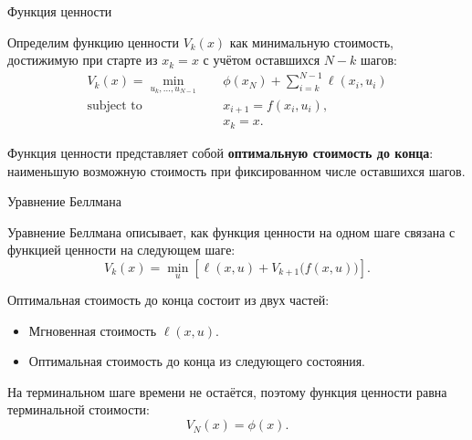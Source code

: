 \documentclass{beamer}
\begin{document}
	\begin{frame}{Функция ценности}
		\begin{flushleft}
			
			Определим функцию ценности $V_k(x)$ как минимальную
			стоимость, достижимую при старте из $x_k=x$ с
			учётом оставшихся $N-k$ шагов:
			\[
			\begin{aligned}
				V_k(x)=\min_{u_k,\ldots,u_{N-1}}\quad
				&\phi(x_N)+\sum_{i=k}^{N-1}\ell(x_i,u_i)\\
				\text{subject to}\quad
				&x_{i+1}=f(x_i,u_i),\\
				&x_k=x.
			\end{aligned}
			\]
			
			\medskip
			
			Функция ценности представляет собой \textbf{оптимальную
				стоимость до конца}: наименьшую возможную стоимость при
			фиксированном числе оставшихся шагов.
			
		\end{flushleft}
	\end{frame}
	
	\begin{frame}{Уравнение Беллмана}
		\begin{flushleft}
			
			Уравнение Беллмана описывает, как функция ценности
			на одном шаге связана с функцией ценности на
			следующем шаге:
			\[
			\boxed{
				V_k(x)=\min_u
				\left[
				\ell(x,u)+V_{k+1}\bigl(f(x,u)\bigr)
				\right].
			}
			\]
			
			\medskip
			
			Оптимальная стоимость до конца состоит из двух частей:
			\begin{itemize}
				\item Мгновенная стоимость $\ell(x,u)$.
				\item Оптимальная стоимость до конца из следующего состояния.
			\end{itemize}
			
			\medskip
			
			На терминальном шаге времени не остаётся, поэтому
			функция ценности равна терминальной стоимости:
			\[
			V_N(x)=\phi(x).
			\]
			
		\end{flushleft}
	\end{frame}
	
	
	
\end{document}
